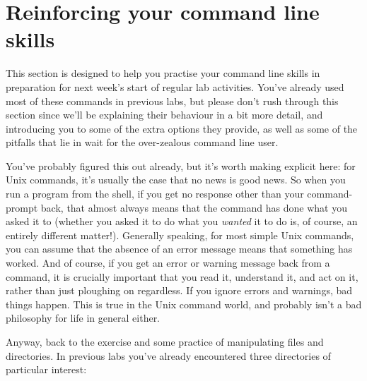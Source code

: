 \section{Reinforcing your command line skills}
\newcommand{\ilinput}[1]{\ttout{#1}}
\newcommand{\crsname}{INTRO}
\newcommand{\Dcrsname}{\fname{/opt/info/courses/INTRO}}
\newcommand{\crsnamelc}{intro}
\newcommand{\return}{\relax}

This section is designed to help you practise your command line skills in preparation  for next week's start of regular lab activities. You've already used most of these commands in previous labs, but please don't rush through this section since we'll be explaining their behaviour in a bit more detail, and introducing you to some of the extra options they provide, as well as some of the pitfalls that lie in wait for the over-zealous command line user.

You've probably figured this out already, but it's worth making explicit here: for Unix commands, it's usually the case that no news is good news. So when you run a program from the shell, if you get no response other than your command-prompt back, that almost always means that the command has done what you asked it to (whether you asked it to do what you \textit{wanted} it to do is, of course, an entirely different matter!). Generally speaking, for most simple Unix commands, you can assume that the absence of an error message means that something has worked. And of course, if you get an error or warning message back from a command, it is crucially important that you read it, understand it, and act on it, rather than just ploughing on regardless. If you ignore errors and warnings, bad things happen. This is true in the Unix command world, and probably isn't a bad philosophy for life in general either.

Anyway, back to the exercise and some practice of manipulating files and directories. In previous labs you've already encountered three directories of particular interest:

